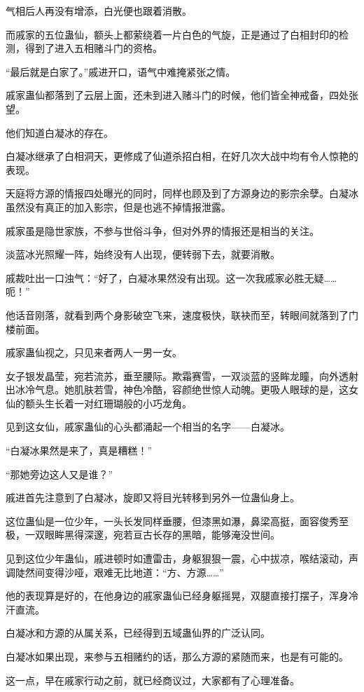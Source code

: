 \begin{this_body}
气相后人再没有增添，白光便也跟着消散。

而戚家的五位蛊仙，额头上都萦绕着一片白色的气旋，正是通过了白相封印的检测，得到了进入五相赌斗门的资格。

“最后就是白家了。”戚进开口，语气中难掩紧张之情。

戚家蛊仙都落到了云层上面，还未到进入赌斗门的时候，他们皆全神戒备，四处张望。

他们知道白凝冰的存在。

白凝冰继承了白相洞天，更修成了仙道杀招白相，在好几次大战中均有令人惊艳的表现。

天庭将方源的情报四处曝光的同时，同样也顾及到了方源身边的影宗余孽。白凝冰虽然没有真正的加入影宗，但是也逃不掉情报泄露。

戚家虽是隐世家族，不参与世俗斗争，但对外界的情报还是相当的关注。

淡蓝冰光照耀一阵，始终没有人出现，便转弱下去，就要消散。

戚裁吐出一口浊气：“好了，白凝冰果然没有出现。这一次我戚家必胜无疑……呃！”

他话音刚落，就看到两个身影破空飞来，速度极快，联袂而至，转眼间就落到了门楼前面。

戚家蛊仙视之，只见来者两人一男一女。

女子银发晶莹，宛若流苏，垂至腰际。欺霜赛雪，一双淡蓝的竖眸龙瞳，向外透射出冰冷气息。她肌肤若雪，神色冷酷，容颜绝世惊人动魄。更吸人眼球的是，这女仙的额头生长着一对红珊瑚般的小巧龙角。

见到这女仙，戚家蛊仙的心头都涌起一个相当的名字——白凝冰。

“白凝冰果然是来了，真是糟糕！”

“那她旁边这人又是谁？”

戚进首先注意到了白凝冰，旋即又将目光转移到另外一位蛊仙身上。

这位蛊仙是一位少年，一头长发同样垂腰，但漆黑如瀑，鼻梁高挺，面容俊秀至极，一双眼眸黑得深邃，宛若亘古长存的黑暗，能够淹没世间。

见到这位少年蛊仙，戚进顿时如遭雷击，身躯狠狠一震，心中拔凉，喉结滚动，声调陡然间变得沙哑，艰难无比地道：“方、方源……”

他的表现算是好的，在他身边的戚家蛊仙已经身躯摇晃，双腿直接打摆子，浑身冷汗直流。

白凝冰和方源的从属关系，已经得到五域蛊仙界的广泛认同。

白凝冰如果出现，来参与五相赌约的话，那么方源的紧随而来，也是有可能的。

这一点，早在戚家行动之前，就已经商议过，大家都有了心理准备。


\end{this_body}

